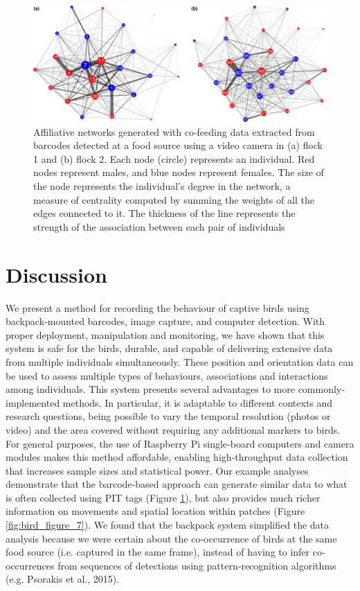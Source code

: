 \documentclass[11pt,a4paper,oneside]{book}
\begin{document}
\begin{doublespace}
\begin{figure}[!htb]
    \centering
    \includegraphics{Graving_IMPRS_Thesis/figures/bird_figure_8.jpg}
    \caption{Affiliative networks generated with co‐feeding data extracted from barcodes detected at a food source using a video camera in (a) flock 1 and (b) flock 2. Each node (circle) represents an individual. Red nodes represent males, and blue nodes represent females. The size of the node represents the individual's degree in the network, a measure of centrality computed by summing the weights of all the edges connected to it. The thickness of the line represents the strength of the association between each pair of individuals
}
    \label{fig:bird_figure_8}
\end{figure}

\section{Discussion}
We present a method for recording the behaviour of captive birds using backpack‐mounted barcodes, image capture, and computer detection. With proper deployment, manipulation and monitoring, we have shown that this system is safe for the birds, durable, and capable of delivering extensive data from multiple individuals simultaneously. These position and orientation data can be used to assess multiple types of behaviours, associations and interactions among individuals. This system presents several advantages to more commonly‐implemented methods. In particular, it is adaptable to different contexts and research questions, being possible to vary the temporal resolution (photos or video) and the area covered without requiring any additional markers to birds. For general purposes, the use of Raspberry Pi single‐board computers and camera modules makes this method affordable, enabling high‐throughput data collection that increases sample sizes and statistical power. Our example analyses demonstrate that the barcode‐based approach can generate similar data to what is often collected using PIT tags (Figure \ref{fig:bird_figure_8}), but also provides much richer information on movements and spatial location within patches (Figure \ref{fig:bird_figure_7}). We found that the backpack system simplified the data analysis because we were certain about the co‐occurrence of birds at the same food source (i.e. captured in the same frame), instead of having to infer co‐occurrences from sequences of detections using pattern‐recognition algorithms (e.g. Psorakis et al., 2015).


\end{doublespace}
\end{document}
